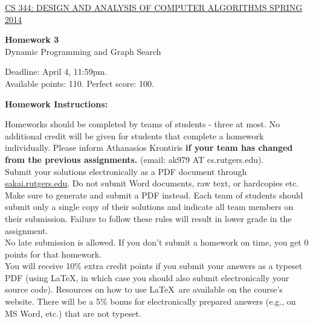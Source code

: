 \documentclass{article}
\begin{document}
\sloppy

\noindent \underline{CS 344: DESIGN AND ANALYSIS OF COMPUTER
  ALGORITHMS \hspace{1.6in} SPRING 2014}

\vspace{0.1in}

\begin{center}
{\bf {\large Homework 3}}\\
Dynamic Programming and Graph Search\\
\end{center}

\vspace{0.1in}

\noindent Deadline: April 4, 11:59pm.\\ 
Available points: 110. Perfect score: 100.\\

\begin{center}
{\bf Homework Instructions:}
\end{center}

 Homeworks should be completed by teams of
students - three at most. No additional credit will be given for
students that complete a homework individually. Please inform
Athanasios Krontiris {\bf if your team has changed from the previous
  assignments.} (email: ak979 AT cs.rutgers.edu).\\

 Submit your solutions electronically
as a PDF document through \url{sakai.rutgers.edu}. Do not submit Word
documents, raw text, or hardcopies etc. Make sure to generate and
submit a PDF instead. Each team of students should submit only a
single copy of their solutions and indicate all team members on their
submission.  Failure to follow these rules will result in lower grade
in the assignment.\\

 No late submission is allowed. If
you don't submit a homework on time, you get 0 points for that
homework.\\

 You will receive 10\% extra
credit points if you submit your answers as a typeset PDF (using
\LaTeX, in which case you should also submit electronically your
source code). Resources on how to use \LaTeX\ are available on the
course's website. There will be a 5\% bonus for electronically
prepared answers (e.g., on MS Word, etc.) that are not typeset.\\
\end{document}
